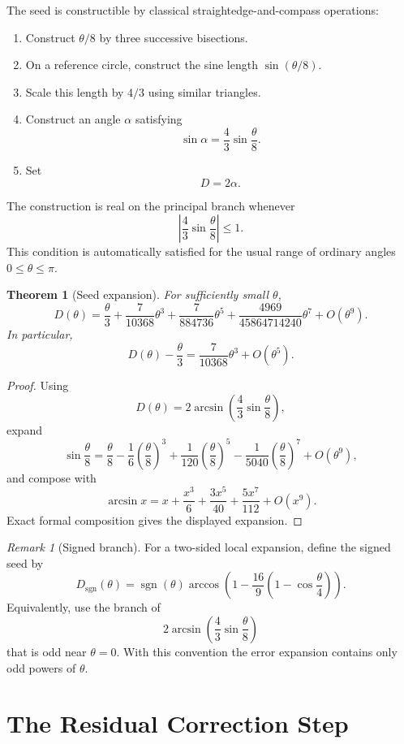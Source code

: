 \documentclass[11pt]{article}
\newtheorem{theorem}{Theorem}
\theoremstyle{remark}
\newtheorem{remark}{Remark}
\begin{document}
The seed is constructible by classical straightedge-and-compass operations:
\begin{enumerate}[label=\arabic*.]
\item Construct $\theta/8$ by three successive bisections.
\item On a reference circle, construct the sine length $\sin(\theta/8)$.
\item Scale this length by $4/3$ using similar triangles.
\item Construct an angle $\alpha$ satisfying
\[
\sin\alpha
=
\frac43\sin\frac{\theta}{8}.
\]
\item Set
\[
D=2\alpha.
\]
\end{enumerate}
The construction is real on the principal branch whenever
\[
\left|\frac43\sin\frac{\theta}{8}\right|
\le 1.
\]
This condition is automatically satisfied for the usual range of ordinary angles
$0\le \theta\le \pi$.

\begin{theorem}[Seed expansion]\label{thm:seed}
For sufficiently small $\theta$,
\[
D(\theta)
=
\frac{\theta}{3}
+
\frac{7}{10368}\theta^3
+
\frac{7}{884736}\theta^5
+
\frac{4969}{45864714240}\theta^7
+
O(\theta^9).
\]
In particular,
\[
D(\theta)-\frac{\theta}{3}
=
\frac{7}{10368}\theta^3+O(\theta^5).
\]
\end{theorem}

\begin{proof}
Using
\[
D(\theta)
=
2\arcsin\!\left(
\frac43\sin\frac{\theta}{8}
\right),
\]
expand
\[
\sin\frac{\theta}{8}
=
\frac{\theta}{8}
-
\frac{1}{6}\left(\frac{\theta}{8}\right)^3
+
\frac{1}{120}\left(\frac{\theta}{8}\right)^5
-
\frac{1}{5040}\left(\frac{\theta}{8}\right)^7
+
O(\theta^9),
\]
and compose with
\[
\arcsin x
=
x+\frac{x^3}{6}+\frac{3x^5}{40}+\frac{5x^7}{112}+O(x^9).
\]
Exact formal composition gives the displayed expansion.
\end{proof}

\begin{remark}[Signed branch]
For a two-sided local expansion, define the signed seed by
\[
D_{\mathrm{sgn}}(\theta)
=
\operatorname{sgn}(\theta)
\arccos\!\left(
1-\frac{16}{9}\left(1-\cos\frac{\theta}{4}\right)
\right).
\]
Equivalently, use the branch of
\[
2\arcsin\!\left(\frac43\sin\frac{\theta}{8}\right)
\]
that is odd near $\theta=0$.  With this convention the error expansion contains only odd
powers of $\theta$.
\end{remark}

\section{The Residual Correction Step}
\end{document}
